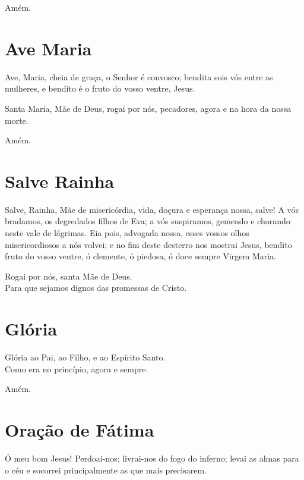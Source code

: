 \documentclass[10pt,a5paper]{book}
\begin{document}
Amém.


\section{Ave Maria}

Ave, Maria, cheia de graça,
o Senhor é convosco;
bendita sois vós entre as mulheres,
e bendito é o fruto do vosso ventre,
Jesus.

Santa Maria, Mãe de Deus,
rogai por nós, pecadores,
agora e na hora da nossa morte.

Amém.


\section{Salve Rainha}

Salve, Rainha,
Mãe de misericórdia,
vida, doçura e esperança nossa, salve!
A vós bradamos, os degredados filhos de Eva;
a vós suspiramos, gemendo e chorando neste vale de lágrimas.
Eia pois, advogada nossa,
esses vossos olhos misericordiosos a nós volvei;
e no fim deste desterro nos mostrai Jesus,
bendito fruto do vosso ventre,
ó clemente, ó piedosa, ó doce sempre Virgem Maria.

Rogai por nós, santa Mãe de Deus. \\
Para que sejamos dignos das promessas de Cristo.


\section{Glória}

Glória ao Pai, ao Filho, e ao Espírito Santo. \\
Como era no princípio, agora e sempre.

Amém.


\section{Oração de Fátima}

Ó meu bom Jesus!
Perdoai-nos;
livrai-nos do fogo do inferno;
levai as almas para o céu
e socorrei principalmente as que mais precisarem.
\end{document}
